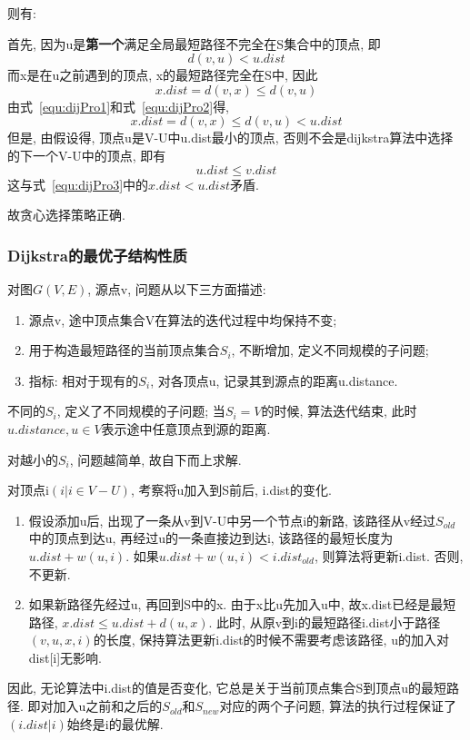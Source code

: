 则有:\par
首先, 因为u是\textbf{第一个}满足全局最短路径不完全在S集合中的顶点, 即
\begin{equation}
	d(v, u) < u.dist
	\label{equ:dijPro1}
\end{equation}
而x是在u之前遇到的顶点, x的最短路径完全在S中, 因此
\begin{equation}
	x.dist = d(v, x) \leq d(v, u)
	\label{equ:dijPro2}
\end{equation}
由式~\ref{equ:dijPro1}和式~\ref{equ:dijPro2}得,
\begin{equation}
	x.dist = d(v, x) \leq d(v, u) < u.dist
	\label{equ:dijPro3}
\end{equation}
但是, 由假设得, 顶点u是V-U中u.dist最小的顶点,
否则不会是dijkstra算法中选择的下一个V-U中的顶点, 即有
\begin{equation}
	u.dist \leq v.dist
\end{equation}
这与式~\ref{equ:dijPro3}中的$x.dist < u.dist$矛盾.\par
故贪心选择策略正确.

\subsubsection{Dijkstra的最优子结构性质}
对图$G(V, E)$, 源点v, 问题从以下三方面描述:
\begin{enumerate}
	\item 源点v, 途中顶点集合V在算法的迭代过程中均保持不变;
	\item 用于构造最短路径的当前顶点集合$S_i$, 不断增加, 定义不同规模的子问题;
	\item 指标: 相对于现有的$S_i$, 对各顶点u, 记录其到源点的距离u.distance.
\end{enumerate}

不同的$S_i$, 定义了不同规模的子问题; 当$S_i = V$的时候, 算法迭代结束,
此时$u.distance, u \in V$表示途中任意顶点到源的距离.\par

对越小的$S_i$, 问题越简单, 故自下而上求解.\par

对顶点i$(i | i \in V-U)$, 考察将u加入到S前后, i.dist的变化.
\begin{enumerate}
	\item 假设添加u后, 出现了一条从v到V-U中另一个节点i的新路,
	      该路径从v经过$S_{old}$中的顶点到达u, 再经过u的一条直接边到达i,
	      该路径的最短长度为$u.dist + w(u, i)$. 如果$u.dist+w(u,i) <
		      i.dist_{old}$, 则算法将更新i.dist. 否则, 不更新.
	\item 如果新路径先经过u, 再回到S中的x. 由于x比u先加入u中,
	      故x.dist已经是最短路径, $x.dist \leq u.dist + d(u, x)$. 此时,
	      从原v到i的最短路径i.dist小于路径$(v,u,x,i)$的长度,
	      保持算法更新i.dist的时候不需要考虑该路径, u的加入对dist[i]无影响.
\end{enumerate}
因此, 无论算法中i.dist的值是否变化, 它总是关于当前顶点集合S到顶点u的最短路径.
即对加入u之前和之后的$S_{old}$和$S_{new}$对应的两个子问题,
算法的执行过程保证了$(i.dist | i)$始终是i的最优解.
